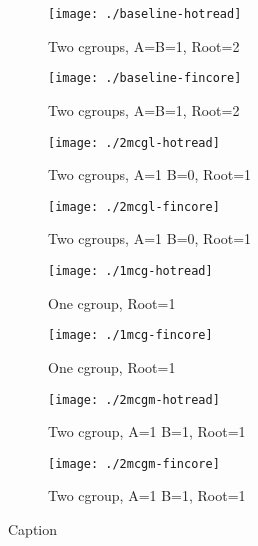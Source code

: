 \documentclass{article}
\begin{document}
\newcommand\subfigurescale{.5\textwidth}
\newcommand\widthscale{\textwidth}
\begin{figure*}
\centering
\begin{subfigure}[t]{\subfigurescale}
\centering
\texttt{[image: ./baseline-hotread]}
\caption{Two cgroups, A=B=1, Root=2}
\end{subfigure}%
\begin{subfigure}[t]{\subfigurescale}
\centering
\texttt{[image: ./baseline-fincore]}
\caption{Two cgroups, A=B=1, Root=2}
\end{subfigure}
\begin{subfigure}[t]{\subfigurescale}
\centering
\texttt{[image: ./2mcgl-hotread]}
\caption{Two cgroups, A=1 B=0, Root=1}
\end{subfigure}%
\begin{subfigure}[t]{\subfigurescale}
\centering
\texttt{[image: ./2mcgl-fincore]}
\caption{Two cgroups, A=1 B=0, Root=1}
\end{subfigure}
\begin{subfigure}[t]{\subfigurescale}
\centering
\texttt{[image: ./1mcg-hotread]}
\caption{One cgroup, Root=1}
\end{subfigure}%
\begin{subfigure}[t]{\subfigurescale}
\centering
\texttt{[image: ./1mcg-fincore]}
\caption{One cgroup, Root=1}
\end{subfigure}
\begin{subfigure}[t]{\subfigurescale}
\centering
\texttt{[image: ./2mcgm-hotread]}
\caption{Two cgroup, A=1 B=1, Root=1}
\end{subfigure}%
\begin{subfigure}[t]{\subfigurescale}
\centering
\texttt{[image: ./2mcgm-fincore]}
\caption{Two cgroup, A=1 B=1, Root=1}
\end{subfigure}
\caption{Caption}
\end{figure*}
\end{document}
